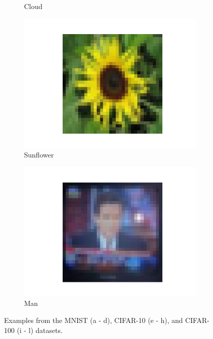 \documentclass[letterpaper]{article} %
\begin{document}
\begin{figure}[htbp]
\begin{subfigure}{0.115\textwidth}
  \caption{Cloud}
\end{subfigure}\hfil
\begin{subfigure}{0.115\textwidth}
  \includegraphics[width=\linewidth]{cifar-100_82.png}
  \caption{Sunflower}
\end{subfigure}\hfil
\begin{subfigure}{0.115\textwidth}
  \includegraphics[width=\linewidth]{cifar-100_87.png}
  \caption{Man}
\end{subfigure}
\caption{Examples from the MNIST (a - d), CIFAR-10 (e - h), and
CIFAR-100 (i - l) datasets.}
\label{fig:datasets}
\end{figure}
\end{document}
